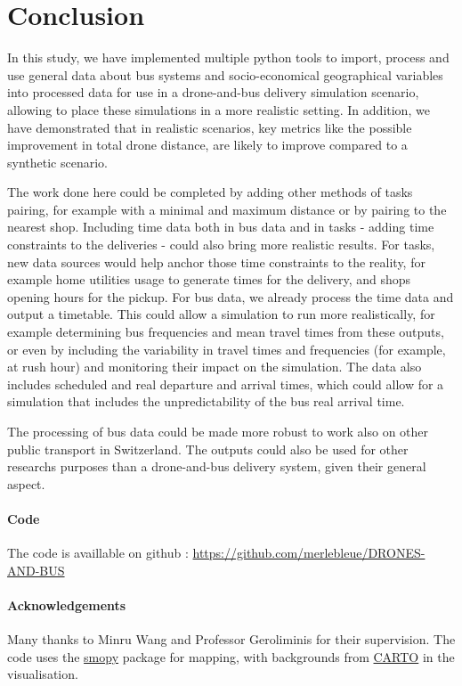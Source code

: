 \section{Conclusion}
\label{sec:conclusion}

In this study, we have implemented multiple python tools to import, process and use general data about bus systems and socio-economical geographical variables into processed data for use in a drone-and-bus delivery simulation scenario, allowing to place these simulations in a more realistic setting. In addition, we have demonstrated that in realistic scenarios, key metrics like the possible improvement in total drone distance, are likely to improve compared to a synthetic scenario.

The work done here could be completed by adding other methods of tasks pairing, for example with a minimal and maximum distance or by pairing to the nearest shop. Including time data both in bus data and in tasks - adding time constraints to the deliveries - could also bring more realistic results. For tasks, new data sources would help anchor those time constraints to the reality, for example home utilities usage to generate times for the delivery, and shops opening hours for the pickup. For bus data, we already process the time data and output a timetable. This could allow a simulation to run more realistically, for example determining bus frequencies and mean travel times from these outputs, or even by including the variability in travel times and frequencies (for example, at rush hour) and monitoring their impact on the simulation. The data also includes scheduled and real departure and arrival times, which could allow for a simulation that includes the unpredictability of the bus real arrival time.

The processing of bus data could be made more robust to work also on other public transport in Switzerland. The outputs could also be used for other researchs purposes than a drone-and-bus delivery system, given their general aspect.

\vspace{7cm}

\paragraph{Code} The code is availlable on github : \url{https://github.com/merlebleue/DRONES-AND-BUS}

\paragraph{Acknowledgements} Many thanks to Minru Wang and Professor Geroliminis for their supervision. The code uses the \href{https://github.com/rossant/smopy}{smopy} package for mapping, with backgrounds from \href{https://carto.com/}{CARTO} in the visualisation.